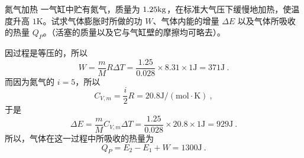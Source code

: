 \begin{example}{氮气加热}
一气缸中贮有氮气，质量为 $1.25\rm kg$，在标准大气压下缓慢地加热，使温度升高 $1\mathrm K$。试求气体膨胀时所做的功 $W$、气体内能的增量 $\Delta E$ 以及气体所吸收的热量 $Q_P$。（活塞的质量以及它与气缸壁的摩擦均可略去）。

因过程是等压的，所以
\begin{equation}
W=\frac{m}{M} R \Delta T=\frac{1.25}{0.028} \times 8.31 \times 1 \mathrm{J}=371 \mathrm{J}~.
\end{equation}
而因为氮气的 $i=5$，所以
\begin{equation}
C_{V, {m}}=\frac{i}{2} R=20.8 \mathrm{J} /(\mathrm{mol} \cdot \mathrm{K})~,
\end{equation}
于是
\begin{equation}
\Delta E=\frac{m}{M} C_{V, {m}} \Delta T=\frac{1.25}{0.028} \times 20.8 \times 1 \mathrm{J}=929 \mathrm{J}~.
\end{equation}
所以，气体在这一过程中所吸收的热量为
\begin{equation}
Q_{P}=E_{2}-E_{1}+W=1300 \mathrm{J}~.
\end{equation}
\end{example}

